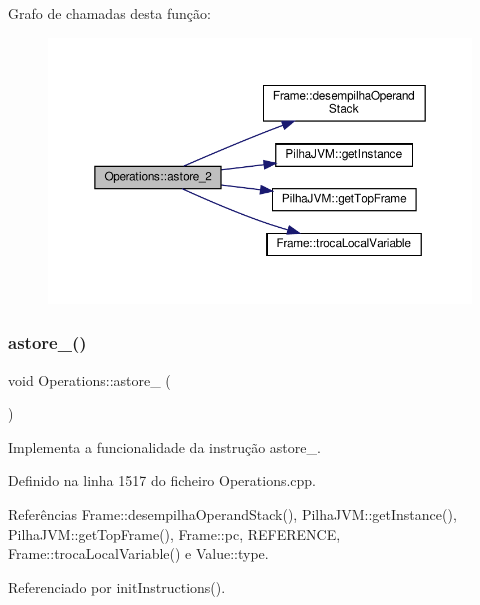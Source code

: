 Grafo de chamadas desta função\+:
\nopagebreak
\begin{figure}[H]
\begin{center}
\leavevmode
\includegraphics[width=350pt]{classOperations_a01e238bbea0f9d61d80a8fcd3ed2f660_cgraph}
\end{center}
\end{figure}
\mbox{\label{classOperations_ac3c02b3ff78b6222bd58bebb4f01c083}} 
\subsubsection{\texorpdfstring{astore\+\_()}{astore\_3()}}
{\footnotesize\ttfamily void Operations\+::astore\+\_ (\begin{DoxyParamCaption}{ }\end{DoxyParamCaption})\hspace{0.3cm}{\ttfamily [private]}}



Implementa a funcionalidade da instrução astore\+\_. 



Definido na linha 1517 do ficheiro Operations.\+cpp.



Referências Frame\+::desempilha\+Operand\+Stack(), Pilha\+J\+V\+M\+::get\+Instance(), Pilha\+J\+V\+M\+::get\+Top\+Frame(), Frame\+::pc, R\+E\+F\+E\+R\+E\+N\+CE, Frame\+::troca\+Local\+Variable() e Value\+::type.



Referenciado por init\+Instructions().


